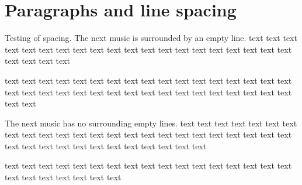 \documentclass[a4paper, 12pt]{article}
\begin{document}
\section{Paragraphs and line spacing}

Testing of spacing. The next music is surrounded by an empty line.
text text text text text text text text text text text text
text text text text text text text text text text text text

{%
\parindent 0pt
\noindent
\ifx\preLilyPondExample \undefined
\else
  \expandafter\preLilyPondExample
\fi
\def\lilypondbook{}%

\ifx\postLilyPondExample \undefined
\else
  \expandafter\postLilyPondExample
\fi
}

text text text text text text text text text text text text
text text text text text text text text text text text text
text text text text text text text text text text text text

The next music has no surrounding empty lines.
text text text text text text text text text text text text
text text text text text text text text text text text text
text text text text text text text text text text text text
{%
\parindent 0pt
\noindent
\ifx\preLilyPondExample \undefined
\else
  \expandafter\preLilyPondExample
\fi
\def\lilypondbook{}%

\ifx\postLilyPondExample \undefined
\else
  \expandafter\postLilyPondExample
\fi
}
text text text text text text text text text text text text
text text text text text text text text text text text text
\end{document}
